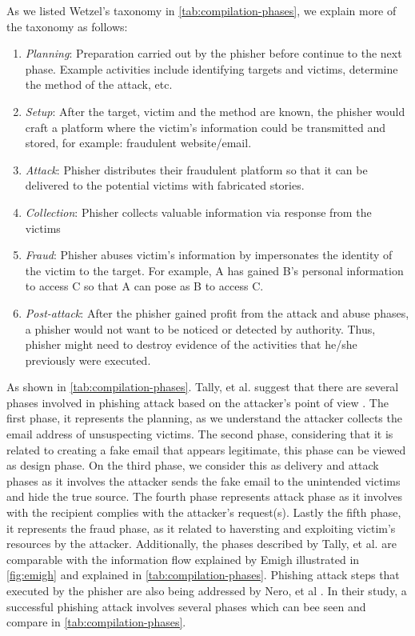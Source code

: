 As we listed Wetzel's taxonomy in \autoref{tab:compilation-phases},
we explain more of the taxonomy as follows:
\begin{enumerate}
\item \textit{Planning}: Preparation carried out by the phisher before continue
to the next phase. Example activities include identifying targets
and victims, determine the method of the attack, etc.
\item \textit{Setup}: After the target, victim and the method are known,
the phisher would craft a platform where the victim's information
could be transmitted and stored, for example: fraudulent website/email.
\item \textit{Attack}: Phisher distributes their fraudulent platform so
that it can be delivered to the potential victims with fabricated
stories.
\item \textit{Collection}: Phisher collects valuable information via response
from the victims
\item \textit{Fraud}: Phisher abuses victim's information by impersonates
the identity of the victim to the target. For example, A has gained
B's personal information to access C so that A can pose as B to access
C.
\item \textit{Post-attack}: After the phisher gained profit from the attack
and abuse phases, a phisher would not want to be noticed or detected
by authority. Thus, phisher might need to destroy evidence of the
activities that he/she previously were executed.
\end{enumerate}
As shown in \autoref{tab:compilation-phases}. Tally, et al. suggest
that there are several phases involved in phishing attack based on
the attacker's point of view \citep{tally:2004}. The first phase,
it represents the planning, as we understand the attacker collects
the email address of unsuspecting victims. The second phase, considering
that it is related to creating a fake email that appears legitimate,
this phase can be viewed as design phase. On the third phase, we consider
this as delivery and attack phases as it involves the attacker sends
the fake email to the unintended victims and hide the true source.
The fourth phase represents attack phase as it involves with the recipient
complies with the attacker's request(s). Lastly the fifth phase, it
represents the fraud phase, as it related to haversting and exploiting
victim's resources by the attacker. Additionally, the phases described
by Tally, et al. \citep{tally:2004} are comparable with the information
flow explained by Emigh\citep{emigh:2005} illustrated in \autoref{fig:emigh}
and explained in \autoref{tab:compilation-phases}. Phishing attack
steps that executed by the phisher are also being addressed by Nero,
et al \citep{nero:2011}. In their study, a successful phishing attack
involves several phases which can bee seen and compare in \autoref{tab:compilation-phases}.

